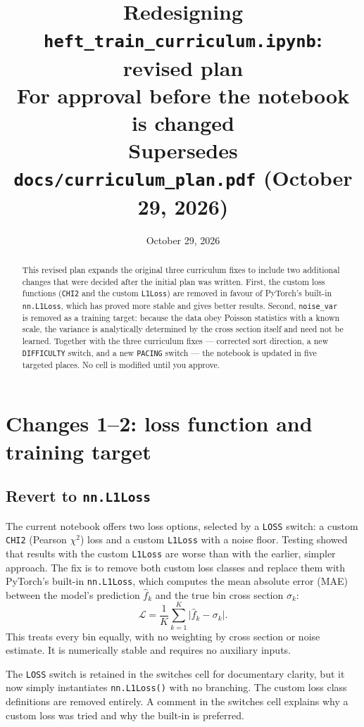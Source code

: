 \documentclass[11pt]{article}
\title{\textbf{Redesigning \texttt{heft\_train\_curriculum.ipynb}:}\\
\textbf{revised plan}\\[4pt]
\large For approval before the notebook is changed\\
\normalsize Supersedes \texttt{docs/curriculum\_plan.pdf} (October 29, 2026)}
\date{October 29, 2026}
\newcommand{\code}[1]{\texttt{#1}}
\begin{document}
\maketitle

\begin{abstract}
\noindent
This revised plan expands the original three curriculum fixes to include two
additional changes that were decided after the initial plan was written. First,
the custom loss functions (\code{CHI2} and the custom \code{L1Loss}) are
removed in favour of PyTorch's built-in \code{nn.L1Loss}, which has proved
more stable and gives better results. Second, \code{noise\_var} is removed as
a training target: because the data obey Poisson statistics with a known
scale, the variance is analytically determined by the cross section itself and
need not be learned. Together with the three curriculum fixes --- corrected
sort direction, a new \code{DIFFICULTY} switch, and a new \code{PACING} switch
--- the notebook is updated in five targeted places. No cell is modified until
you approve.
\end{abstract}

\section{Changes 1--2: loss function and training target}

\subsection{Revert to \texttt{nn.L1Loss}}

The current notebook offers two loss options, selected by a \code{LOSS}
switch: a custom \code{CHI2} (Pearson $\chi^2$) loss and a custom
\code{L1Loss} with a noise floor. Testing showed that results with the custom
\code{L1Loss} are worse than with the earlier, simpler approach. The fix is to
remove both custom loss classes and replace them with PyTorch's built-in
\code{nn.L1Loss}, which computes the mean absolute error (MAE) between
the model's prediction $\hat{f}_k$ and the true bin cross section $\sigma_k$:
\[
  \mathcal{L} = \frac{1}{K} \sum_{k=1}^{K} \bigl|\hat{f}_k - \sigma_k\bigr|.
\]
This treats every bin equally, with no weighting by cross section or noise
estimate. It is numerically stable and requires no auxiliary inputs.

The \code{LOSS} switch is retained in the switches cell for documentary
clarity, but it now simply instantiates \code{nn.L1Loss()} with no branching.
The custom loss class definitions are removed entirely. A comment in the
switches cell explains why a custom loss was tried and why the built-in is
preferred.
\end{document}

